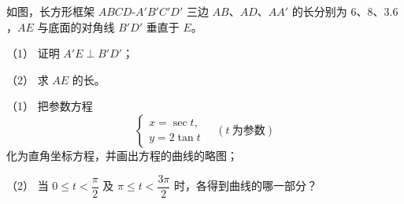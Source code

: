 \begin{question}
如图，长方形框架 $ABCD\text{-}A'B'C'D'$ 三边 $AB$、$AD$、$AA'$ 的长分别为 $6$、$8$、$3.6$，$AE$ 与底面的对角线 $B'D'$ 垂直于 $E$。

（1） 证明 $A'E\perp B'D'$；

（2） 求 $AE$ 的长。
\nopagebreak[4]
\begin{center}\end{center}
\nopagebreak[4]
\end{question}
\begin{question}

（1） 把参数方程
\nopagebreak[4]
\[
\begin{cases}
x=\sec t,\\
y=2\tan t
\end{cases}
\quad(t\ \text{为参数})
\]
化为直角坐标方程，并画出方程的曲线的略图；

（2） 当 $0\le t<\dfrac{\pi}{2}$ 及 $\pi\le t<\dfrac{3\pi}{2}$ 时，各得到曲线的哪一部分？

\end{question}